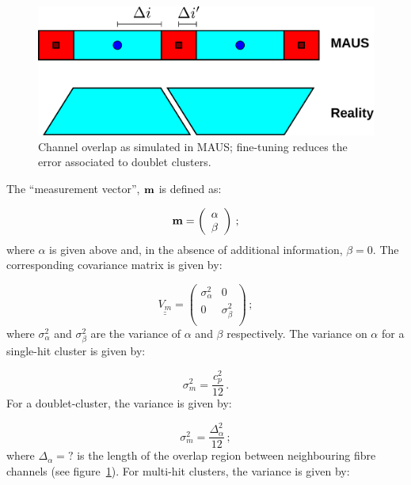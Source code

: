 \begin{figure}
  \begin{center}
    \includegraphics[width=0.9\linewidth]{detectors/tracker/04-Reconstruction/04-01-Hits-and-clusters/Figures/cluster-resolution.pdf}
  \end{center}
  \caption{Channel overlap as simulated in MAUS; fine-tuning reduces the error associated to doublet clusters.} 
  \label{Fig:Clust}
\end{figure}
The ``measurement vector'', ${\bf m}$ is defined as:

\begin{equation}
  {\bf m} =  \left( 
               \begin{array}{c}
                 \alpha \\ \beta
               \end{array}
              \right) \, ;
\end{equation}
where $\alpha$ is given above and, in the absence of additional information, $\beta = 0$. The corresponding covariance matrix is given by:

\begin{equation}
  \underline{\underline{V_m}} = 
    \left( 
      \begin{array}{cc}
         \sigma^2_\alpha & 0         \\
         0          & \sigma^2_\beta \\
       \end{array}
     \right) \, ;
\end{equation}
where $\sigma^2_\alpha$ and $\sigma^2_\beta$ are the variance of $\alpha$ and $\beta$ respectively. The variance on $\alpha$ for a single-hit cluster is given by:

\begin{equation}
  \sigma^2_m = \frac{c^2_p}{12} \, .
\end{equation}
For a doublet-cluster, the variance is given by:

\begin{equation}
  \sigma^2_m = \frac{\Delta^2_\alpha}{12} \, ;
\end{equation}
where $\Delta_\alpha = ?$ is the length of the overlap region between neighbouring fibre channels (see figure~\ref{Fig:Clust}). For multi-hit clusters, the variance is given by:

